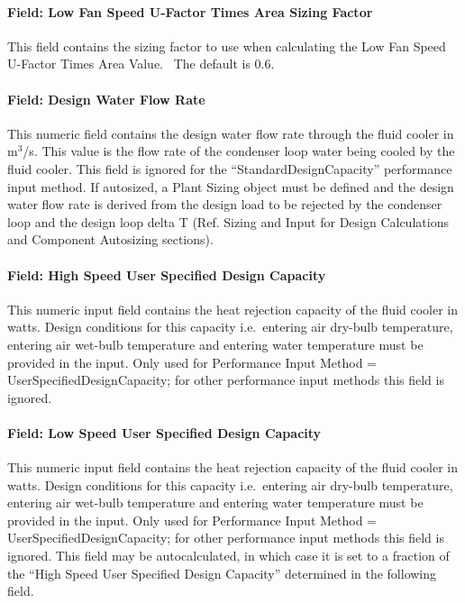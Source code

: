\paragraph{Field: Low Fan Speed U-Factor Times Area Sizing Factor}\label{field-low-fan-speed-u-factor-times-area-sizing-factor-1}

This field contains the sizing factor to use when calculating the Low Fan Speed U-Factor Times Area Value.~ The default is 0.6.

\paragraph{Field: Design Water Flow Rate}\label{field-design-water-flow-rate-5}

This numeric field contains the design water flow rate through the fluid cooler in m\(^{3}\)/s. This value is the flow rate of the condenser loop water being cooled by the fluid cooler. This field is ignored for the ``StandardDesignCapacity'' performance input method. If autosized, a Plant Sizing object must be defined and the design water flow rate is derived from the design load to be rejected by the condenser loop and the design loop delta T (Ref. Sizing and Input for Design Calculations and Component Autosizing sections).

\paragraph{Field: High Speed User Specified Design Capacity}\label{field-high-speed-user-specified-design-capacity}

This numeric input field contains the heat rejection capacity of the fluid cooler in watts. Design conditions for this capacity i.e.~entering air dry-bulb temperature, entering air wet-bulb temperature and entering water temperature must be provided in the input. Only used for Performance Input Method = UserSpecifiedDesignCapacity; for other performance input methods this field is ignored.

\paragraph{Field: Low Speed User Specified Design Capacity}\label{field-low-speed-user-specified-design-capacity}

This numeric input field contains the heat rejection capacity of the fluid cooler in watts. Design conditions for this capacity i.e.~entering air dry-bulb temperature, entering air wet-bulb temperature and entering water temperature must be provided in the input. Only used for Performance Input Method = UserSpecifiedDesignCapacity; for other performance input methods this field is ignored. This field may be autocalculated, in which case it is set to a fraction of the ``High Speed User Specified Design Capacity'' determined in the following field.

